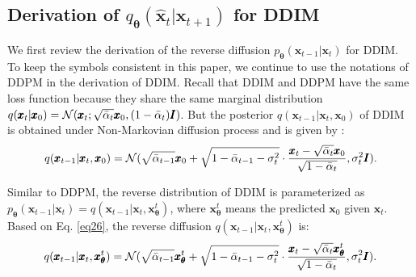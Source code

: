 \documentclass{article} \usepackage{iclr2024_conference,times}
\begin{document}
\subsection{Derivation of \texorpdfstring{$q_{\pmb{\theta}}(\hat{\pmb{x}}_{t} | \pmb{x}_{t+1})$}{Lg} for DDIM}
\label{Append:1.5}
We first review the derivation of the reverse diffusion $p_{\pmb{\theta}}(\pmb{x}_{t-1}|\pmb{x}_{t})$ for DDIM. To keep the symbols consistent in this paper, we continue to use the notations of DDPM in the derivation of DDIM. Recall that DDIM and DDPM have the same loss function because they share the same marginal distribution $q(\pmb{x}_t | \pmb{x}_0) = {\cal N} (\pmb{x}_t; \sqrt{\bar{\alpha}_t} \pmb{x}_0, (1-\bar{\alpha}_t) \pmb{I})$. But the posterior $q(\pmb{x}_{t-1} | \pmb{x}_{t}, \pmb{x}_{0})$ of DDIM is obtained under Non-Markovian diffusion process and is given by \citet{DDIM}:
\begin{equation}
\label{eq26}
q(\pmb{x}_{t-1} | \pmb{x}_t, \pmb{x}_0) = {\cal N} (\sqrt{\bar{\alpha}_{t-1}} \pmb{x}_0 + \sqrt{1-\bar{\alpha}_{t-1}-\sigma_t^2} \cdot \frac{\pmb{x}_t-\sqrt{\bar{\alpha}_t} \pmb{x}_0}{\sqrt{1-\bar{\alpha}_t}}, \sigma_t^2 \pmb{I}).
\end{equation}

\noindent
Similar to DDPM, the reverse distribution of DDIM is parameterized as $p_{\pmb{\theta}}(\pmb{x}_{t-1} | \pmb{x}_t) = q(\pmb{x}_{t-1} | \pmb{x}_t, \pmb{x}^{t}_{\pmb{\theta}})$, where $\pmb{x}^{t}_{\pmb{\theta}}$ means the predicted $\pmb{x}_0$ given $\pmb{x}_t$. Based on Eq. \ref{eq26}, the reverse diffusion $q(\pmb{x}_{t-1} | \pmb{x}_t, \pmb{x}^{t}_{\pmb{\theta}})$ is: 
\begin{equation}
\label{eq27}
q(\pmb{x}_{t-1} | \pmb{x}_t, \pmb{x}^{t}_{\pmb{\theta}}) = {\cal N} (\sqrt{\bar{\alpha}_{t-1}} \pmb{x}^{t}_{\pmb{\theta}} + \sqrt{1-\bar{\alpha}_{t-1}-\sigma_t^2} \cdot \frac{\pmb{x}_t-\sqrt{\bar{\alpha}_t} \pmb{x}^{t}_{\pmb{\theta}}}{\sqrt{1-\bar{\alpha}_t}}, \sigma_t^2 \pmb{I}).
\end{equation}
\end{document}
